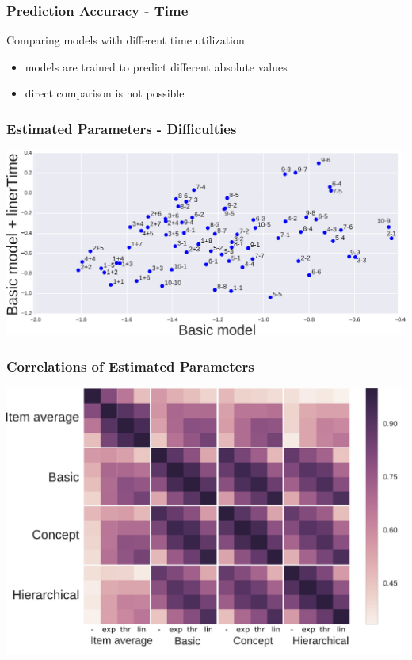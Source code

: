 \documentclass[xcolor=svgnames]{beamer}
\begin{document}
\begin{frame}
    \frametitle{Prediction Accuracy - Time}

    Comparing models with different time utilization
    \begin{itemize}
        \item models are trained to predict different absolute values
        \item direct comparison is not possible
    \end{itemize}
\end{frame}
\begin{frame}
    \frametitle{Estimated Parameters - Difficulties}

    \includegraphics[width=\linewidth]{figures/difficulties-one-color}
\end{frame}
\begin{frame}
    \frametitle{Correlations of Estimated Parameters}
    \includegraphics[width=\linewidth]{figures/difficulty-correlations}
\end{frame}
\end{document}
